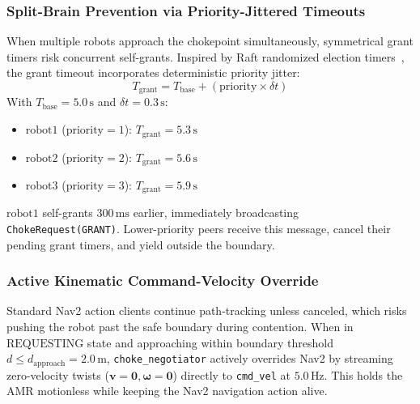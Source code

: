 \documentclass[10pt,twocolumn,a4paper]{article}
\theoremstyle{definition}
\begin{document}
\subsubsection{Split-Brain Prevention via Priority-Jittered Timeouts}
When multiple robots approach the chokepoint simultaneously, symmetrical grant timers risk concurrent self-grants. Inspired by Raft randomized election timers~\cite{ongaro2014search}, the grant timeout incorporates deterministic priority jitter:
\begin{equation}
    T_{\text{grant}} = T_{\text{base}} + (\text{priority} \times \delta t)
\end{equation}
With $T_{\text{base}} = 5.0\,\text{s}$ and $\delta t = 0.3\,\text{s}$:
\begin{itemize}
    \item $\text{robot1}$ ($\text{priority}=1$): $T_{\text{grant}} = 5.3\,\text{s}$
    \item $\text{robot2}$ ($\text{priority}=2$): $T_{\text{grant}} = 5.6\,\text{s}$
    \item $\text{robot3}$ ($\text{priority}=3$): $T_{\text{grant}} = 5.9\,\text{s}$
\end{itemize}
$\text{robot1}$ self-grants $300\,\text{ms}$ earlier, immediately broadcasting \texttt{ChokeRequest(GRANT)}. Lower-priority peers receive this message, cancel their pending grant timers, and yield outside the boundary.

\subsubsection{Active Kinematic Command-Velocity Override}
Standard Nav2 action clients continue path-tracking unless canceled, which risks pushing the robot past the safe boundary during contention. When in $\text{REQUESTING}$ state and approaching within boundary threshold $d \le d_{\text{approach}} = 2.0\,\text{m}$, \texttt{choke\_negotiator} actively overrides Nav2 by streaming zero-velocity twists ($\mathbf{v} = \mathbf{0}, \boldsymbol{\omega} = \mathbf{0}$) directly to \texttt{cmd\_vel} at $5.0\,\text{Hz}$. This holds the AMR motionless while keeping the Nav2 navigation action alive.
\end{document}
